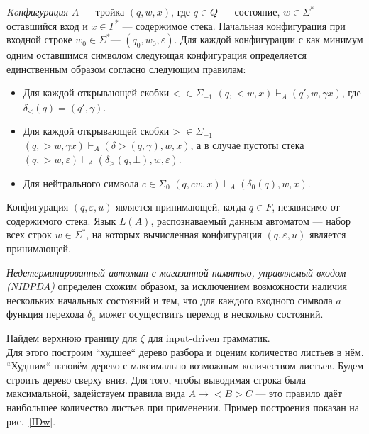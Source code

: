 \documentclass{spbau-diploma}
\begin{document}
\textit{Koнфигурация} $A$ --- тройка $(q, w, x)$, где $q \in Q$ --- состояние, $w \in \Sigma^*$ --- оставшийся вход и $x \in \Gamma^*$ --- содержимое стека. Начальная конфигурация при входной строке $w_0 \in \Sigma^*$--- $(q_0, w_0, \varepsilon)$. Для каждой конфигурации с как минимум одним оставшимся символом следующая конфигурация определяется единственным образом согласно следующим правилам:
\begin{itemize}
         \item Для каждой открывающей скобки < $\in \Sigma_{+1}$  $(q, <w, x) \vdash_A (q', w,  \gamma x)$, где $\delta_<(q) = (q', \gamma)$.
         \item Для каждой открывающей скобки > $\in \Sigma_{-1}$  $(q, >w,\gamma x) \vdash_A (\delta >(q, \gamma),  w, x)$, а в случае пустоты стека $(q, >w, \varepsilon) \vdash_A (\delta_>(q, \bot),  w, \varepsilon)$.
	\item Для нейтрального символа $c \in \Sigma_0$ $(q, cw, x) \vdash_A (\delta_0(q),  w, x)$.
\end{itemize}
Конфигурация $(q, \varepsilon, u)$ является принимающей, когда $q \in F$, независимо от содержимого стека. Язык $L(A)$, распознаваемый данным автоматом --- набор всех строк $w \in \Sigma^*$, на которых вычисленная конфигурация  $(q, \varepsilon, u)$ является принимающей. \par
\textit{Недетерминированный автомат с магазинной памятью, управляемый входом (NIDPDA)} определен схожим образом, за исключением возможности наличия нескольких начальных состояний и тем, что для каждого входного символа $a$ функция перехода $\delta_a$ может осуществить переход в несколько состояний. \par
Найдем верхнюю границу для $\zeta$ для input-driven грамматик. 
\\Для этого построим ``худшее`` дерево разбора и оценим количество листьев в нём. ``Худшим`` назовём дерево с максимально возможным количеством листьев. Будем строить дерево сверху вниз. Для того, чтобы выводимая строка была максимальной, задействуем правила вида $A \rightarrow <B>C$ --- это правило даёт наибольшее количество листьев при применении. Пример построения показан на рис.~\ref{IDw}. 
\\
\end{document}
